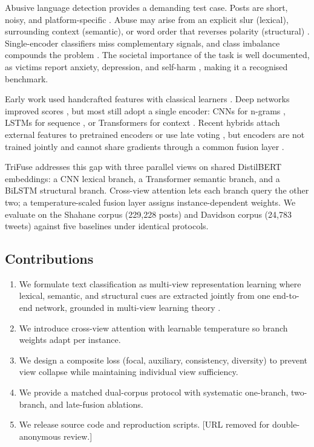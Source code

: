 \documentclass[10pt,twocolumn,a4paper]{article}
\begin{document}
Abusive language detection provides a demanding test case. Posts are short, noisy, and platform-specific \citep{ref12}. Abuse may arise from an explicit slur (lexical), surrounding context (semantic), or word order that reverses polarity (structural) \citep{ref2,ref4,ref37}. Single-encoder classifiers miss complementary signals, and class imbalance compounds the problem \citep{ref23}. The societal importance of the task is well documented, as victims report anxiety, depression, and self-harm \citep{ref1,ref39,ref42}, making it a recognised benchmark.

Early work used handcrafted features with classical learners \citep{ref2,ref5,ref6,ref18}. Deep networks improved scores \citep{ref3}, but most still adopt a single encoder: CNNs for n-grams \citep{ref7}, LSTMs for sequence \citep{ref8}, or Transformers for context \citep{ref9,ref32,ref34}. Recent hybrids attach external features to pretrained encoders or use late voting \citep{ref14,ref15,ref16,ref33}, but encoders are not trained jointly and cannot share gradients through a common fusion layer \citep{ref19}.

TriFuse addresses this gap with three parallel views on shared DistilBERT embeddings: a CNN lexical branch, a Transformer semantic branch, and a BiLSTM structural branch. Cross-view attention lets each branch query the other two; a temperature-scaled fusion layer assigns instance-dependent weights. We evaluate on the Shahane corpus (229,228 posts) \citep{ref10} and Davidson corpus (24,783 tweets) \citep{ref11} against five baselines under identical protocols.

\subsection{Contributions}\label{subsec:contributions}

\begin{enumerate}
\item We formulate text classification as multi-view representation learning where lexical, semantic, and structural cues are extracted jointly from one end-to-end network, grounded in multi-view learning theory \citep{ref19}.
\item We introduce cross-view attention with learnable temperature so branch weights adapt per instance.
\item We design a composite loss (focal, auxiliary, consistency, diversity) to prevent view collapse while maintaining individual view sufficiency.
\item We provide a matched dual-corpus protocol with systematic one-branch, two-branch, and late-fusion ablations.
\item We release source code and reproduction scripts. [URL removed for double-anonymous review.]
\end{enumerate}
\end{document}

